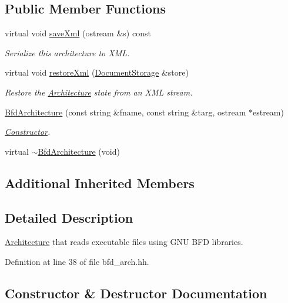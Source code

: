 \subsection*{Public Member Functions}
\begin{DoxyCompactItemize}
\item 
virtual void \mbox{\hyperlink{class_bfd_architecture_ac775d8894dd3abba1effafe22881a131}{save\+Xml}} (ostream \&s) const
\begin{DoxyCompactList}\small\item\em Serialize this architecture to X\+ML. \end{DoxyCompactList}\item 
virtual void \mbox{\hyperlink{class_bfd_architecture_a577d1f082486f2cd6f134d1ce5eb3989}{restore\+Xml}} (\mbox{\hyperlink{class_document_storage}{Document\+Storage}} \&store)
\begin{DoxyCompactList}\small\item\em Restore the \mbox{\hyperlink{class_architecture}{Architecture}} state from an X\+ML stream. \end{DoxyCompactList}\item 
\mbox{\hyperlink{class_bfd_architecture_ae164cc02f6b1fd8711dc24dea2a03afd}{Bfd\+Architecture}} (const string \&fname, const string \&targ, ostream $\ast$estream)
\begin{DoxyCompactList}\small\item\em \mbox{\hyperlink{class_constructor}{Constructor}}. \end{DoxyCompactList}\item 
virtual \mbox{\hyperlink{class_bfd_architecture_a5c72f0cdb60dbbfdfcbcd8f2e0d2310a}{$\sim$\+Bfd\+Architecture}} (void)
\end{DoxyCompactItemize}
\subsection*{Additional Inherited Members}


\subsection{Detailed Description}
\mbox{\hyperlink{class_architecture}{Architecture}} that reads executable files using G\+NU B\+FD libraries. 

Definition at line 38 of file bfd\+\_\+arch.\+hh.



\subsection{Constructor \& Destructor Documentation}
\mbox{\label{class_bfd_architecture_ae164cc02f6b1fd8711dc24dea2a03afd}} 
